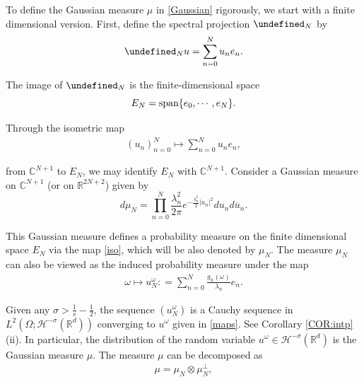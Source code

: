 \documentclass[%
11pt,  reqno]{amsart}
\theoremstyle{remarkstyle}
\newcommand{\1}{\hspace{0.2mm}\text{I}\hspace{0.2mm}}
\newcommand{\noi}{\noindent}
\newcommand{\R}{\mathbb{R}}
\let\P= \undefined
\newcommand{\P}{\mathbf{P}}
\newcommand{\Q}{\mathbf{Q}}
\newcommand{\ld}{\lambda}
\newcommand{\s}{\sigma}
\renewcommand{\o}{\omega}
\renewcommand{\O}{\Omega}
\renewcommand{\H}{\mathcal{H}}
\numberwithin{equation}{section}
\numberwithin{theorem}{section}
\begin{document}
	
	To define the Gaussian measure $\mu$ in \eqref{Gaussian} rigorously, 
	we start with a finite dimensional version.
	First, define the spectral projection $\P_N$ by
	\begin{align}
		\label{projN}
		\P_N u =  \sum_{n=0}^N u_n  e_n.
	\end{align} 
	
	
	\noi 
	The image of $\P_N$ is the finite-dimensional space
	\[
	E_N = \textup{span} \{ e_0, \cdots, e_N\}.
	\]
	
	\noi
	Through the isometric map 
	\begin{align}
		(u_n)_{n=0}^N \mapsto \sum_{n=0}^N u_n e_n,
		\label{iso}
	\end{align}
	
	\noi
	from $\mathbb C^{N+1}$ to $E_N$, 
	we may identify $E_N$ with $\mathbb C^{N+1}$.
	Consider a Gaussian measure on 
	$\mathbb C^{N+1}$ (or on $ \R^{2N+2}$) given by
	\[
	d  \mu_N = \prod_{n=0}^N \frac{\ld_n^2}{2\pi} e^{-\frac{\ld_n^2}2 |u_n|^2} d u_n d \overline{u}_n.
	\]
	
	\noi
	This Gaussian measure defines a probability measure on the finite dimensional space $E_N$ 
	via the map \eqref{iso},
	which will be also denoted by $\mu_N$.
	The measure $\mu_N$ can also be viewed as the induced
	probability measure under the map 
	\begin{align}
		\o \mapsto u_N^\o  :  = \sum_{n=0}^N \frac{g_n (\o)}{\ld_n}  e_n  .
		\label{RVN}
	\end{align}
	
	\noi
	Given any $\s > \frac1s - \frac12$, 
	the sequence $(u_N^\o)$
	is a Cauchy sequence in $L^2 (\O; \H^{- \s} (\R^d))$ converging to $u^\o$ given in \eqref{maps}.
	See Corollary \ref{COR:intp} (ii).
	In particular,
	the distribution of the random variable $u^\o \in \H^{- \s}(\R^d)$ is the
	Gaussian measure $\mu$.
	The measure $\mu$ can be decomposed as
	\begin{align}
		\label{mu}
		\mu = \mu_N \otimes \mu_N^\perp,
	\end{align}
	
\end{document}
